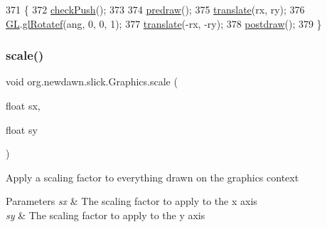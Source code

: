 \begin{DoxyCode}
371                                                       \{
372         \mbox{\hyperlink{classorg_1_1newdawn_1_1slick_1_1_graphics_a58dfa60d60ec7f56b17e420458b3724e}{checkPush}}();
373 
374         \mbox{\hyperlink{classorg_1_1newdawn_1_1slick_1_1_graphics_a7b4c203181e3b6302d51ed9b24596b8d}{predraw}}();
375         \mbox{\hyperlink{classorg_1_1newdawn_1_1slick_1_1_graphics_ad75589e65f1d524870c0b719172ba065}{translate}}(rx, ry);
376         \mbox{\hyperlink{classorg_1_1newdawn_1_1slick_1_1_graphics_a39ca68db81b225982a4421c4a6835eed}{GL}}.\mbox{\hyperlink{interfaceorg_1_1newdawn_1_1slick_1_1opengl_1_1renderer_1_1_s_g_l_ac5675bd1b391998a8bf63d5d87a04347}{glRotatef}}(ang, 0, 0, 1);
377         \mbox{\hyperlink{classorg_1_1newdawn_1_1slick_1_1_graphics_ad75589e65f1d524870c0b719172ba065}{translate}}(-rx, -ry);
378         \mbox{\hyperlink{classorg_1_1newdawn_1_1slick_1_1_graphics_abe054371d1486618ff327bbbcf02ff97}{postdraw}}();
379     \}
\end{DoxyCode}
\mbox{\label{classorg_1_1newdawn_1_1slick_1_1_graphics_a1eb01ca52c2eebfb0ceab9edfb90cfd1}} 
\subsubsection{\texorpdfstring{scale()}{scale()}}
{\footnotesize\ttfamily void org.\+newdawn.\+slick.\+Graphics.\+scale (\begin{DoxyParamCaption}\item[{float}]{sx,  }\item[{float}]{sy }\end{DoxyParamCaption})\hspace{0.3cm}{\ttfamily [inline]}}

Apply a scaling factor to everything drawn on the graphics context


\begin{DoxyParams}{Parameters}
{\em sx} & The scaling factor to apply to the x axis \\
\hline
{\em sy} & The scaling factor to apply to the y axis \\
\hline
\end{DoxyParams}

